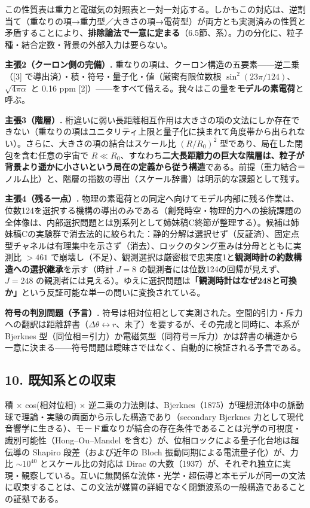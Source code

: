 \documentclass[
  a4paper,
]{ltjsarticle}
\begin{document}
この性質表は重力と電磁気の対照表と一対一対応する。しかもこの対応は、逆割当て（重なりの項→重力型／大きさの項→電荷型）が両方とも実測済みの性質と矛盾することにより、\textbf{排除論法で一意に定まる}（6.5節、系）。力の分化に、粒子種・結合定数・背景の外部入力は要らない。

\textbf{主張2（クーロン側の完備）.}
重なりの項は、クーロン構造の五要素------逆二乗（{[}3{]}
で導出済）・積・符号・量子化・値（厳密有限位数根
\(\sin^2(23\pi/124)\)、\(\sqrt{4\pi\alpha}\) と 0.16 ppm
{[}2{]}）------をすべて備える。我々はこの量を\textbf{モデルの素電荷}と呼ぶ。

\textbf{主張3（階層）.}
桁違いに弱い長距離相互作用は大きさの項の文法にしか存在できない（重なりの項はユニタリティ上限と量子化に挟まれて角度帯から出られない）。さらに、大きさの項の結合はスケール比
\((R/R_0)^2\) 型であり、局在した閉包を含む任意の宇宙で
\(R\ll R_0\)、すなわち\textbf{二大長距離力の巨大な階層は、粒子が背景より遥かに小さいという局在の定義から従う構造}である。前提（重力結合＝ノルム比）と、階層の指数の導出（スケール辞書）は明示的な課題として残す。

\textbf{主張4（残る一点）.}
物理の素電荷との同定へ向けてモデル内部に残る作業は、位数124を選択する機構の導出のみである（創発時空・物理的力への接続課題の全体像は、内部選択問題とは別系列として姉妹稿C終節が整理する）。候補は姉妹稿Cの実験群で消去法的に絞られた：静的分解は選択せず（反証済）、固定点型チャネルは有理集中を示さず（消去）、ロックのタング重みは分母とともに実測比
\(>461\)
で崩壊し（不足）、観測選択は厳密根で忠実度1と\textbf{観測時計の約数構造への選択継承}を示す（時計
\(J=8\) の観測者には位数124の回帰が見えず、\(J=248\)
の観測者には見える）。ゆえに選択問題は\textbf{「観測時計はなぜ248と可換か」}という反証可能な単一の問いに変換されている。

\textbf{符号の判別問題（予言）.}
符号は相対位相として実測された。空間的引力・斥力への翻訳は距離辞書（\(\Delta\theta\leftrightarrow r\)、未了）を要するが、その完成と同時に、本系が
Bjerknes
型（同位相＝引力）か電磁気型（同符号＝斥力）かは辞書の構造から一意に決まる------符号問題は曖昧さではなく、自動的に検証される予言である。

\subsection{10.
既知系との収束}\label{ux65e2ux77e5ux7cfbux3068ux306eux53ceux675f}

積 × cos(相対位相) ×
逆二乗の力法則は、Bjerknes（1875）が理想流体中の脈動球で理論・実験の両面から示した構造であり（secondary
Bjerknes
力として現代音響学に生きる）、モード重なりが結合の存在条件であることは光学の可視度・識別可能性（Hong--Ou--Mandel
を含む）が、位相ロックによる量子化台地は超伝導の Shapiro
段差（および近年の Bloch 振動同期による電流量子化）が、力比
\(\sim10^{40}\) とスケール比の対応は Dirac
の大数（1937）が、それぞれ独立に実現・観察している。互いに無関係な流体・光学・超伝導と本モデルが同一の文法に収束することは、この文法が媒質の詳細でなく閉鎖波系の一般構造であることの証拠である。
\end{document}
